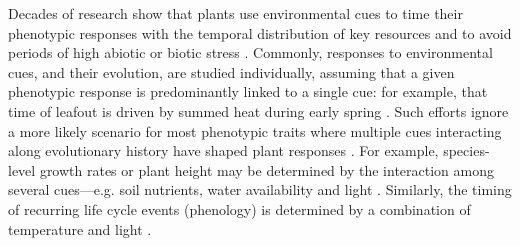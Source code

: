 \documentclass{article}\usepackage[]{graphicx}\usepackage[]{color}
\begin{document}

Decades of research show that plants use environmental cues to time their phenotypic responses with the temporal distribution of key resources and to avoid periods of high abiotic or biotic stress \citep{larcher1980,Chuine2000}. Commonly, responses to environmental cues, and their evolution, are studied individually, assuming that a given phenotypic response is predominantly linked to a single cue: for example, that time of leafout is driven by summed heat during early spring \citep{Wolkovich:2012n,davies2013phylogenetic}. Such efforts ignore a more likely scenario for most phenotypic traits where multiple cues interacting along evolutionary history have shaped plant responses \citep{}. For example, species-level growth rates or plant height may be determined by the interaction among several cues---e.g. soil nutrients, water availability and light \citep{larcher1980}. Similarly, the timing of recurring life cycle events (phenology) is determined by a combination of temperature and light \citep{chuinearees}.\\
\end{document}
